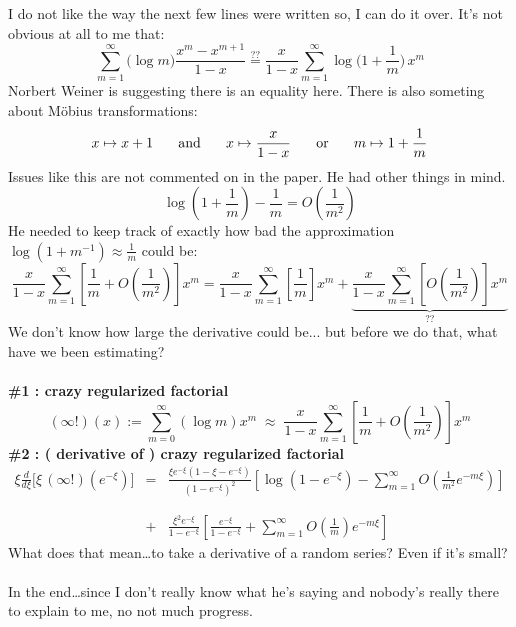 \documentclass[12pt]{article}
\begin{document}
\newpage

\noindent I do not like the way the next few lines were written so, I can do it over. It's not obvious at all to me that:
$$ \sum_{m=1}^\infty \big(\log m \big) \frac{x^m - x^{m+1}}{1-x} \stackrel{??}{=} \frac{x}{1-x} \sum_{m=1}^\infty  \log \Big( 1 + \frac{1}{m}  \Big) \, x^m $$
Norbert Weiner is suggesting there is an equality here.  There is also someting about M\"{o}bius transformations:
$$ x \mapsto x + 1 \hspace{0.25in}\text{and}\hspace{0.25in} x \mapsto \frac{x}{1-x}
\hspace{0.25in}\text{or}\hspace{0.25in}m \mapsto 1+\frac{1}{m}$$
Issues like this are not commented on in the paper.  He had other things in mind.
$$ \log \left( 1 + \frac{1}{m} \right)  - \frac{1}{m} = O \left(\frac{1}{m^2} \right) $$
He needed to keep track of exactly how bad the approximation $\log(1 + m^{-1})\approx \frac{1}{m}$ could be:
$$ \frac{x}{1-x}\sum_{m=1}^\infty \left[ \frac{1}{m} + O\left( \frac{1}{m^2}\right) \right] x^m  = 
\frac{x}{1-x}\sum_{m=1}^\infty \left[ \frac{1}{m} \right] x^m 
+ 
\underbrace{\frac{x}{1-x} \sum_{m=1}^\infty \left[ O\left( \frac{1}{m^2}\right) \right] x^m }_{??} $$
We don't know how large the derivative could be... but before we do that, what have we been estimating? \\ \\
\textbf{\#1 : crazy regularized factorial} 
$$ (\infty!)(x) := \sum_{m=0}^\infty (\log m) x^m \;\approx\; \frac{x}{1-x}\sum_{m=1}^\infty \left[ \frac{1}{m} + O\left( \frac{1}{m^2}\right) \right] x^m  $$
\textbf{\#2 : ( derivative of ) crazy regularized factorial}
\begin{eqnarray*}  \xi \frac{d}{d\xi} \Big[ \xi \,(\infty!)(e^{-\xi}) \Big] 
&=& \frac{\xi e^{-\xi} (1 - \xi - e^{-\xi} )}{(1 - e^{-\xi})^2} \left[ \log(1 - e^{-\xi}) -  \sum_{m=1}^\infty  O\left( \frac{1}{m^2} e^{-m \xi} \right) \right]  \\ \\ \\
&+& \frac{\xi^2 e^{-\xi}}{1 - e^{-\xi}} \left[ \frac{e^{-\xi}}{1 - e^{-\xi}} + \sum_{m=1}^\infty
O\left( \frac{1}{m} \right) e^{-m\xi}\right]   \end{eqnarray*}
What does that mean\dots to take a derivative of a random series? Even if it's small? \\ \\
In the end\dots since I don't really know what he's saying and nobody's really there to explain to me, no not much progress. \\ \\
\end{document}
